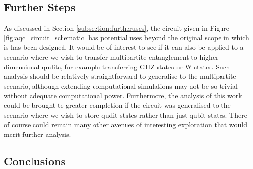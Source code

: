 \subsection{Further Steps}
\label{subsection:furthersteps}
As discussed in Section \ref{subsection:furtheruses}, the circuit given in Figure \ref{fig:aqc_circuit_schematic} has potential uses beyond the original scope in which is has been designed.
It would be of interest to see if it can also be applied to a scenario where we wish to transfer multipartite entanglement to higher dimensional qudits, for example transferring GHZ states or W states.
Such analysis should be relatively straightforward to generalise to the multipartite scenario, although extending computational simulations may not be so trivial without adequate computational power.
Furthermore, the analysis of this work could be brought to greater completion if the circuit was generalised to the scenario where we wish to store qudit states rather than just qubit states.
There of course could remain many other avenues of interesting exploration that would merit further analysis.

\subsection{Conclusions}
\label{subsection:conclusions}